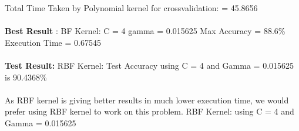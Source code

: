 \documentclass[paper=a4, fontsize=11pt]{scrartcl} %
\numberwithin{equation}{section} %
\numberwithin{figure}{section} %
\numberwithin{table}{section} %
\begin{document}
Total Time Taken by Polynomial kernel for crossvalidation: = 45.8656\\\\

\textbf{Best Result} : BF Kernel: C = 4 gamma = 0.015625 Max Accuracy = 88.6\% Execution Time = 0.67545\\\\

\textbf{Test Result:} RBF Kernel: Test Accuracy using C = 4 and Gamma = 0.015625 is 90.4368\%\\\\

As RBF kernel is giving better results in much lower execution time, we would prefer using RBF kernel to work on this problem. RBF Kernel: using C = 4 and Gamma = 0.015625
\end{document}
